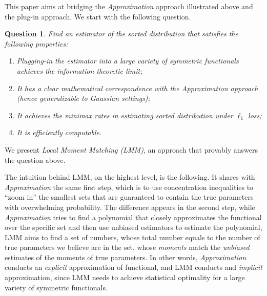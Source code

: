 \documentclass[final,12pt]{colt2018} %
\newtheorem{question}{Question}
\begin{document}
This paper aims at bridging the \emph{Approximation} approach illustrated above and the plug-in approach. We start with the following question. 

\begin{question}\label{question}
	Find an estimator of the sorted distribution that satisfies the following properties:
	\begin{enumerate}
		\item Plugging-in the estimator into a large variety of symmetric functionals achieves the information theoretic limit;
		\item It has a clear mathematical correspondence with the \emph{Approximation} approach (hence generalizable to Gaussian settings);
		\item It achieves the minimax rates in estimating sorted distribution under $\ell_1$ loss;
		\item It is efficiently computable.
	\end{enumerate}
\end{question}

We present \emph{Local Moment Matching \rm (LMM)}, an approach that provably answers the question above. 

The intuition behind LMM, on the highest level, is the following. It shares with \emph{Approximation} the same first step, which is to use concentration inequalities to ``zoom in'' the smallest sets that are guaranteed to contain the true parameters with overwhelming probability. The difference appears in the second step, while \emph{Approximation} tries to find a polynomial that closely approximates the functional over the specific set and then use unbiased estimators to estimate the polynomial, LMM aims to find a set of numbers, whose total number equals to the number of true parameters we believe are in the set, whose \emph{moments} match the \emph{unbiased} estimates of the moments of true parameters. In other words, \emph{Approximation} conducts an \emph{explicit} approximation of functional, and LMM conducts and \emph{implicit} approximation, since LMM needs to achieve statistical optimality for a large variety of symmetric functionals.  
\end{document}
